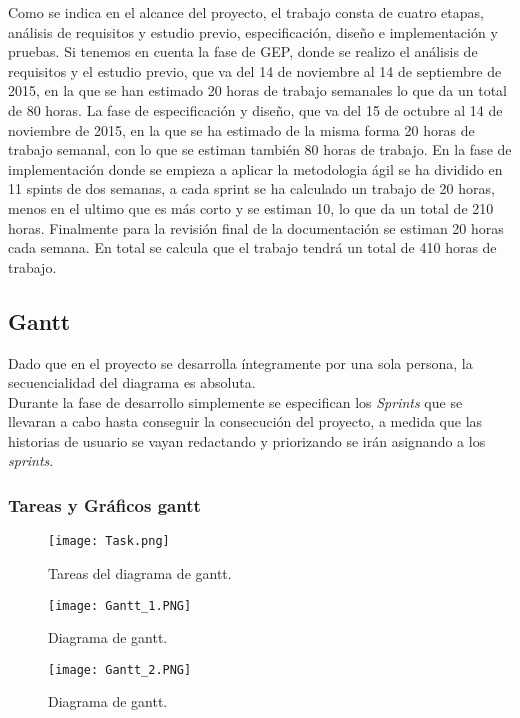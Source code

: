Como se indica en el alcance del proyecto, el trabajo consta de cuatro etapas, análisis de requisitos y estudio previo, especificación, diseño e implementación y pruebas. 
Si tenemos en cuenta la fase de GEP, donde se realizo el análisis de requisitos y el estudio previo, que va del 14 de noviembre al 14 de septiembre de 2015, en la que se han estimado 20 horas de trabajo semanales lo que da un total de 80 horas.
La fase de especificación y diseño, que va del 15 de octubre al 14 de noviembre de 2015, en la que se ha estimado de la misma forma 20 horas de trabajo semanal, con lo que se estiman también 80 horas de trabajo.
En la fase de implementación donde se empieza a aplicar la metodologia ágil se ha dividido en 11 spints de dos semanas, a cada sprint se ha calculado un trabajo de 20 horas, menos en el ultimo que es más corto y se estiman 10, lo que da un total de 210 horas.
Finalmente para la revisión final de la documentación se estiman 20 horas cada semana.
En total se calcula que el trabajo tendrá un total de 410 horas de trabajo.
\newpage

\subsection{Gantt}
Dado que en el proyecto se desarrolla íntegramente por una sola persona, la secuencialidad del diagrama es absoluta.
\\ Durante la fase de desarrollo simplemente se especifican los \textit{Sprints} que se llevaran a cabo hasta conseguir la consecución del proyecto, a medida que las historias de usuario se vayan redactando y priorizando se irán asignando a los \textit{sprints}.

\subsubsection{Tareas y Gráficos gantt}
\begin{figure}[ht!]
\center
\texttt{[image: Task.png]}
\caption{Tareas del diagrama de gantt.}
\label{fig:task}
\end{figure}
\newpage
\begin{landscape}
\begin{figure}[ht!]
\center
\texttt{[image: Gantt\_1.PNG]}
\caption{Diagrama de gantt.}
\label{fig:gantt_1}
\end{figure}

\begin{figure}[ht!]
\center
\texttt{[image: Gantt\_2.PNG]}
\caption{Diagrama de gantt.}
\label{fig:gantt_2}
\end{figure}

\end{landscape}
\newpage


